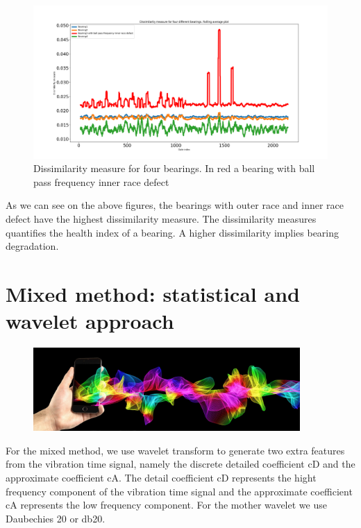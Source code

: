 \documentclass[11pt, oneside]{article}   	%
\begin{document}
\begin{figure}[H] %
   \centering
   \includegraphics[width=7in]{statistics_dissimilarity_bpfi} 
   \caption{Dissimilarity measure for four bearings. In red a bearing with ball pass frequency inner race defect}
   \label{fig:example}
\end{figure}

As we can see on the above figures, the bearings with outer race and inner race defect have the highest dissimilarity measure. The dissimilarity measures quantifies the health index of a bearing. A higher dissimilarity implies bearing degradation.
\section{Mixed method: statistical and wavelet approach}
\begin{figure}[H] %
   \centering
   \includegraphics[width=4in]{mixed4} 
   \caption{}
   \label{fig:example}
\end{figure}
For the mixed method, we use wavelet transform to generate two extra features from the vibration time signal, namely the discrete detailed coefficient cD and the approximate coefficient cA. The detail coefficient cD represents the hight frequency component of the vibration time signal and the approximate coefficient cA represents  
the low frequency component.  For the mother wavelet we use Daubechies 20 or db20.
\end{document}
